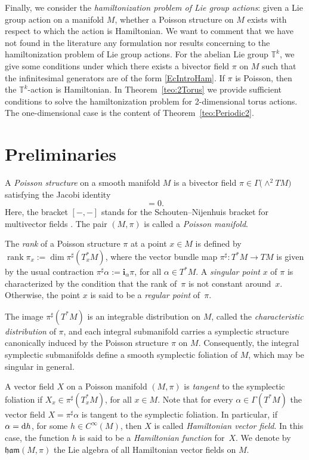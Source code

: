 \documentclass[pdftex]{sigma}%
\newcommand{\dd}{{\rm d}}
\newcommand{\ii}{\mathbf{i}}
\numberwithin{equation}{section}
\begin{document}
Finally, we consider the \emph{hamiltonization problem of Lie group actions}: given a Lie group action on a manifold $M$, whether a Poisson structure on $M$ exists with respect to which the action is Hamiltonian. We want to comment that we have not found in the literature any formulation nor results concerning to the hamiltonization problem of Lie group actions. For the abelian Lie group $\mathbb{T}^k$, we give some conditions under which there exists a bivector field $\pi$ on $M$ such that the infinitesimal generators are of the form \eqref{EcIntroHam}. If $\pi$ is Poisson, then the $\mathbb{T}^k$-action is Hamiltonian. In Theorem~\ref{teo:2Torus} we provide sufficient conditions to solve the hamiltonization problem for 2-dimensional torus actions. The one-dimensional case is the content of Theorem~\ref{teo:Periodic2}.

\section{Preliminaries} %

A \emph{Poisson structure} on a smooth manifold $M$ is a bivector field $\pi \in \Gamma \big({\wedge}^2 TM\big)$ satisfying the Jacobi identity
 \begin{equation*}
 [\pi,\pi] = 0.
 \end{equation*}
Here, the bracket $[-,-]$ stands for the Schouten--Nijenhuis bracket for multivector fields \cite[Section~1.8]{DZ}. The pair $(M,\pi)$ is called a \emph{Poisson manifold}.

The \emph{rank} of a Poisson structure $\pi$ at a point $x \in M$ is defined by $\operatorname{rank}\pi_{x} := \dim\pi^{\sharp}(T^{\ast}_{x}M)$, where the vector bundle map $\pi^{\sharp}\colon T^{*}M \to TM$ is given by the usual contraction $\pi^{\sharp}\alpha := \ii_{\alpha}\pi$, for all $\alpha \in T^{\ast}M$. A \emph{singular point} $x$ of $\pi$ is characterized by the condition that the rank of~$\pi$ is not constant around~$x$. Otherwise, the point $x$ is said to be a \emph{regular point} of~$\pi$.

The image $\pi^{\sharp}(T^{\ast}M)$ is an integrable distribution on $M$, called the \emph{characteristic distribution} of $\pi$, and each integral submanifold carries a symplectic structure canonically induced by the Poisson structure $\pi$ on $M$. Consequently, the integral symplectic submanifolds define a smooth symplectic foliation of $M$, which may be singular in general.

A vector field $X$ on a Poisson manifold $(M,\pi)$ is \emph{tangent} to the symplectic foliation if $X_{x} \in \pi^{\sharp}(T^{*}_{x}M)$, for all $x \in M$. Note that for every $\alpha \in \Gamma(T^{*}M)$ the vector field $X = \pi^{\sharp}\alpha$ is tangent to the symplectic foliation. In particular, if $\alpha = \dd{h}$, for some $h \in C^{\infty}(M)$, then $X$ is called \emph{Hamiltonian vector field}. In this case, the function $h$ is said to be a \emph{Hamiltonian function} for~$X$. We denote by $\mathfrak{ham}(M,\pi)$ the Lie algebra of all Hamiltonian vector fields on $M$.
\end{document}
